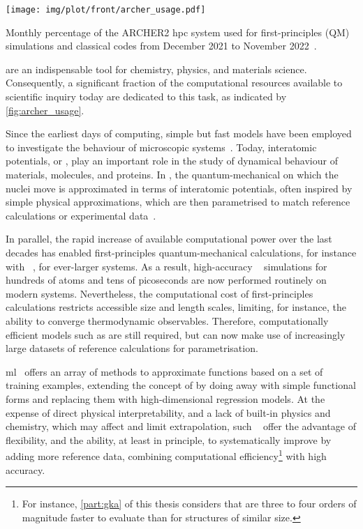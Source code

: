 \begin{marginfigure}[25\baselineskip]
  \texttt{[image: img/plot/front/archer\_usage.pdf]}
  \caption{
  Monthly percentage of the ARCHER2 \gls{hpc} system used for first-principles (QM) simulations and classical \md codes from December 2021 to November 2022~\cite{archer_usage}.
  }
  \label{fig:archer_usage}
\end{marginfigure}



 are an indispensable tool for chemistry, physics, and materials science. Consequently, a significant fraction of the computational resources available to scientific inquiry today are dedicated to this task, as indicated by \cref{fig:archer_usage}.

Since the earliest days of computing, simple but fast models have been employed to investigate the behaviour of microscopic systems~\cite{mrtt1953p,wp1957p,r1964p,v1967p}. Today, interatomic potentials, or \ffs, play an important role in the study of dynamical behaviour of materials, molecules, and proteins. In \ffs, the quantum-mechanical \bo \pes on which the nuclei move is approximated in terms of interatomic potentials, often inspired by simple physical approximations, which are then parametrised to match reference calculations or experimental data~\cite{pc2003p,g2011p,psaa2015p}.

In parallel, the rapid increase of available computational power over the last decades has enabled first-principles quantum-mechanical calculations, for instance with \dft~\cite{hk1964p,ks1965p,thxy2022p}, for ever-larger systems. As a result, high-accuracy \aimd~\cite{cp1985p} simulations for hundreds of atoms and tens of picoseconds are now performed routinely on modern  systems. Nevertheless, the computational cost of first-principles calculations restricts accessible size and length scales, limiting, for instance, the ability to converge thermodynamic observables. Therefore, computationally efficient models such as \ffs are still required, but can now make use of increasingly large datasets of reference calculations for parametrisation.

\Gls{ml}~\cite{hastie2009} offers an array of methods to approximate functions based on a set of training examples, extending the concept of \ffs by doing away with simple functional forms and replacing them with high-dimensional regression models.
At the expense of direct physical interpretability, and a lack of built-in physics and chemistry, which may affect and limit extrapolation, such \mlps~\cite{lgs2004q,lhsr2006q,bp2007q,bpkc2010q,ukkm2020q,uctm2021q,pt2021q} offer the advantage of flexibility, and the ability, at least in principle, to systematically improve by adding more reference data, combining computational efficiency\footnote{
For instance, \cref{part:gka} of this thesis considers \mlps that are three to four orders of magnitude faster to evaluate than \dft for structures of similar size.
} with high accuracy.

